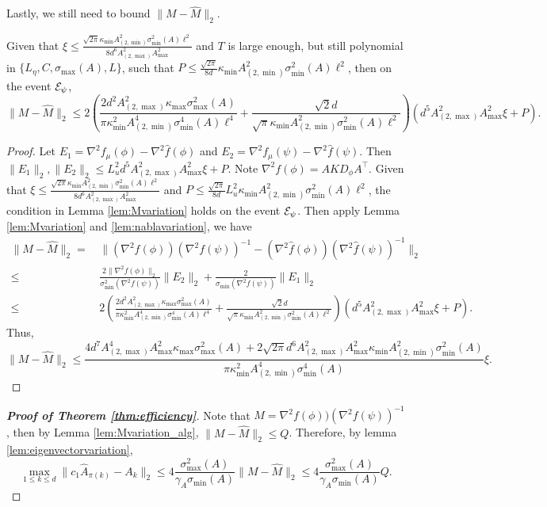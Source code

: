 Lastly, we still need to bound $\|M - \widehat{M}\|_2$.
\begin{lemma}
\label{lem:Mvariation_alg}
Given that $\xi \le \frac{\sqrt{2\pi}\kappa_{\min}A^2_{(2,\min)}\sigma_{\min}^2(A)\ell^2}{8d^6 A_{(2,\max)}^2A_{\max}^2}$ and $T$  is large enough, but still polynomial in $\{L_\eta, C, \sigma_{\max}(A), L\}$, such that $P \le \frac{\sqrt{2\pi}}{8d}\kappa_{\min}A^2_{(2,\min)}\sigma_{\min}^2(A)\ell^2$, then on the event $\mathcal{E}_{\psi}$, 
\[ 
\|M - \widehat{M}\|_2 \le 2\left( \frac{2d^2A_{(2,\max)}^2\kappa_{\max}\sigma_{\max}^2(A)}{\pi\kappa^2_{\min}A^4_{(2,\min)}\sigma_{\min}^4(A)\ell^4} + 
\frac{\sqrt{2}d}{\sqrt{\pi}\kappa_{\min}A^2_{(2,\min)}\sigma_{\min}^2(A)\ell^2}
\right)\left(d^5 A_{(2,\max)}^2A_{\max}^2\xi + P\right).
\]
\end{lemma}
\begin{proof}
Let $E_1 = \nabla^2 f_{\mu}(\phi) - \nabla^2 \widehat{f}(\phi)$ and $ E_2 = \nabla^2 f_{\mu}(\psi) - \nabla^2 \widehat{f}(\psi)$. Then $\|E_1\|_2 , \|E_2\|_2 \le L_u^2d^5 A_{(2,\max)}^2A_{\max}^2\xi + P$.
Note $\nabla^2f(\phi) = AKD_{\phi} A^{\top}$.
Given that $\xi \le  \frac{\sqrt{2\pi}\kappa_{\min}A^2_{(2,\min)}\sigma_{\min}^2(A)\ell^2}{8d^6 A_{(2,\max)}^2A_{\max}^2}$ and $P \le \frac{\sqrt{2\pi}}{8d}L_u^2\kappa_{\min}A^2_{(2,\min)}\sigma_{\min}^2(A)\ell^2$, the condition in Lemma \ref{lem:Mvariation} holds on the event $\mathcal{E}_{\psi}$. 
Then apply Lemma \ref{lem:Mvariation} and \ref{lem:nablavariation}, we have
\begin{align*}
\|M - \widehat{M}\|_2 =\, & \|(\nabla^2 f(\phi))(\nabla^2f(\psi))^{-1} - (\nabla^2 \widehat{f}(\phi))(\nabla^2\widehat{f}(\psi))^{-1} \|_2 \\
\le \, &\frac{2\|\nabla^2 f(\phi)\|_2}{\sigma_{\min}^2(\nabla^2f(\psi))}\|E_2\|_2 + \frac{2}{\sigma_{\min}(\nabla^2f(\psi))}\|E_1\|_2 \\
\le \, & 2\left( \frac{2d^2A_{(2,\max)}^2\kappa_{\max}\sigma_{\max}^2(A)}{\pi\kappa^2_{\min}A^4_{(2,\min)}\sigma_{\min}^4(A)\ell^4} + 
\frac{\sqrt{2}d}{\sqrt{\pi}\kappa_{\min}A^2_{(2,\min)}\sigma_{\min}^2(A)\ell^2}
\right)\left(d^5 A_{(2,\max)}^2A_{\max}^2\xi + P\right).
\end{align*}
Thus, 
\[ 
\|M - \widehat{M}\|_2 \le \frac{4d^7A_{(2,\max)}^4A_{\max}^2\kappa_{\max}\sigma_{\max}^2(A) + 2\sqrt{2\pi}d^6A_{(2,\max)}^2A_{\max}^2\kappa_{\min}A^2_{(2,\min)}\sigma_{\min}^2(A)}{\pi\kappa^2_{\min}A^4_{(2,\min)}\sigma_{\min}^4(A)} \xi.
\]
\fi
\end{proof}
\begin{proof}[{\bf Proof of Theorem  \ref{thm:efficiency}}]
Note that $M = \nabla^2f(\phi))(\nabla^2f(\psi))^{-1}$,  then by Lemma \ref{lem:Mvariation_alg}, $\|M-\widehat{M}\|_2 \le Q$.
Therefore, by lemma \ref{lem:eigenvectorvariation}, 
  \[
  \max_{1\le k\le d}\| c_1\widehat{A}_{\pi(k)} - A_k\|_2 \le 4 \frac{\sigma_{\max}^2(A)}{\gamma_A \sigma_{\min}(A)}\|M - \widehat{M} \|_2 \le 4 \frac{\sigma_{\max}^2(A)}{\gamma_A \sigma_{\min}(A)} Q. 
  \]
 
\end{proof}

